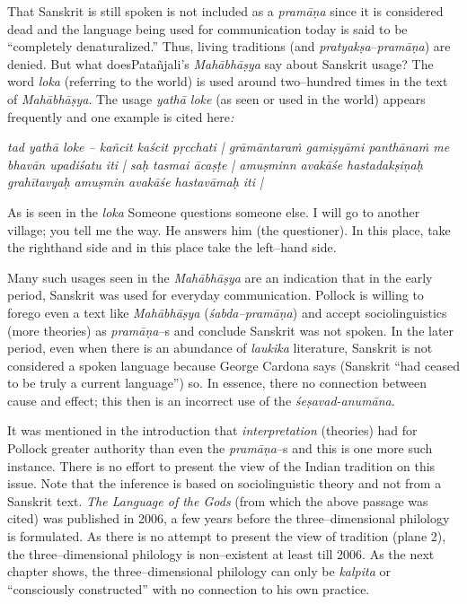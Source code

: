 That Sanskrit is still spoken is not included as a \textit{pramāṇa} since it is considered dead and the language being used for communication today is said to be “completely denaturalized.” Thus, living traditions (and \textit{pratyakṣa}–\textit{pramāṇa}) are denied. But what doesPatañjali’s \textit{Mahābhāṣya }say about Sanskrit usage? The word \textit{loka} (referring to the world) is used around two–hundred times in the text of\textit{ Mahābhāṣya}. The usage \textit{yathā loke} (as seen or used in the world) appears frequently and one example is cited here\textit{:}

\vspace{.2cm}

\begin{myquote}
\textit{tad yathā loke – kañcit kaścit pṛcchati | grāmāntaraṁ gamiṣyāmi panthānaṁ me bhavān upadiśatu iti | saḥ tasmai ācaṣṭe | amuṣminn avakāśe hastadakṣiṇaḥ grahītavyaḥ amuṣmin avakāśe hastavāmaḥ iti |}
\end{myquote}

\vspace{.2cm}

\begin{myquote}
As is seen in the \textit{loka} Someone questions someone else. I will go to another village; you tell me the way. He answers him (the questioner). In this place, take the righthand side and in this place take the left–hand side.
\end{myquote}

Many such usages seen in the\textit{ Mahābhāṣya }are an indication that in the early period, Sanskrit was used for everyday communication. Pollock is willing to forego even a text like \textit{Mahābhāṣya }(\textit{śabda–pramāṇa}) and accept sociolinguistics (more theories) as \textit{pramāṇa}–s and conclude Sanskrit was not spoken. In the later period, even when there is an abundance of \textit{laukika} literature, Sanskrit is not considered a spoken language because George Cardona says (Sanskrit “had ceased to be truly a current language”) so. In essence, there no connection between cause and effect; this then is an incorrect use of the \textit{śeṣavad-anumāna}.

It was mentioned in the introduction that \textit{interpretation} (theories) had for Pollock greater authority than even the\textit{ pramāṇa}–s and this is one more such instance. There is no effort to present the view of the Indian tradition on this issue. Note that the inference is based on sociolinguistic theory and not from a Sanskrit text. \textit{The Language of the Gods} (from which the above passage was cited) was published in 2006, a few years before the three–dimensional philology is formulated. As there is no attempt to present the view of tradition (plane 2), the three–dimensional philology is non–existent at least till 2006. As the next chapter shows, the three–dimensional philology can only be \textit{kalpita} or “consciously constructed” with no connection to his own practice.


